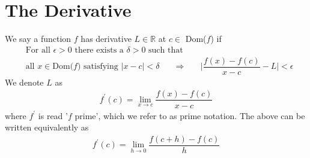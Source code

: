 \section{The Derivative}\label{the_derivative}

\begin{definition}
We say a function $f$ has derivative $L \in \mathbb{R}$ at $c \in$ Dom($f$) if 
\begin{align*}
    &\text{For all} \hspace{4pt} \epsilon > 0 \hspace{4pt} \text{there exists a} \hspace{4pt} \delta > 0 \hspace{4pt} \text{such that}\\[2ex]
    &\text{all} \hspace{4pt} x \in \text{Dom($f$)} \hspace{4pt} \text{satisfying} \hspace{4pt} \lvert x-c \rvert < \delta \hspace{20pt} \Longrightarrow \hspace{20pt} \Big\lvert \dfrac{f(x)-f(c)}{x-c}-L \Big\rvert < \epsilon
\end{align*}
We denote $L$ as
\begin{align*}
f^{'}(c) = \lim_{x \longrightarrow c} \dfrac{f(x)-f(c)}{x-c}
\end{align*}
where $f^{'}$ is read '$f$ prime', which we refer to as prime notation. The above can be written equivalently as
\begin{align*}
    f^{'}(c) = \lim_{h \longrightarrow 0} \dfrac{f(c+h)-f(c)}{h}
\end{align*}
\end{definition}

